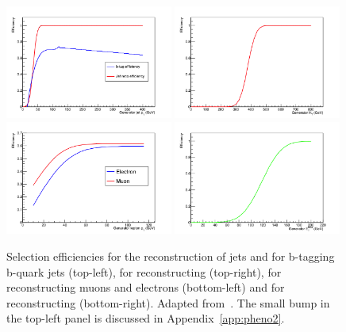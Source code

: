 \begin{figure}[ht!]
\begin{center}
\includegraphics[width=0.49\textwidth]{images/Pheno/BTagEff.png}
\includegraphics[width=0.49\textwidth]{images/Pheno/HTEff.png}\\
\includegraphics[width=0.49\textwidth]{images/Pheno/LeptonEff.png}
\includegraphics[width=0.49\textwidth]{images/Pheno/METEff.png}
\end{center}
\caption{Selection efficiencies for the reconstruction of jets and for b-tagging b-quark jets (top-left), for reconstructing \HT (top-right), for reconstructing muons and electrons (bottom-left) and for reconstructing \MET (bottom-right). Adapted from~\cite{Chatrchyan:2013fea}. The small bump in the top-left panel is discussed in Appendix~\ref{app:pheno2}.}
\label{fig:effGraphs}
\end{figure}
